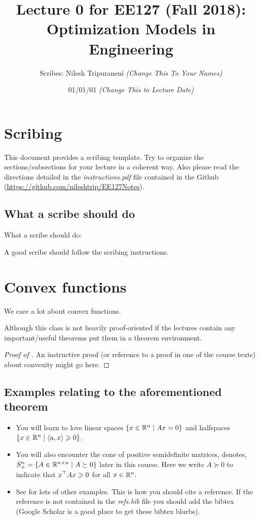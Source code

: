 \documentclass[12pt]{article}
\title{Lecture 0 for EE127 (Fall 2018): Optimization Models in Engineering}
\author{Scribes: Nilesh Tripuraneni \textit{(Change This To Your Names)}}
\date{01/01/01 \textit{(Change This to Lecture Date)}}
\begin{document}
\maketitle

\section{Scribing}

This document provides a scribing template. Try to organize the sections/subsections for your lecture in a coherent way. Also please read the directions detailed in the \emph{instructions.pdf} file contained in the Github (\url{https://github.com/nileshtrip/EE127Notes}).

\subsection{What a scribe should do}
What a scribe should do:
\begin{definition}
A good scribe should follow the scribing instructions.
\end{definition}

\section{Convex functions}
We care a lot about convex functions.

\begin{theorem}
Although this class is not heavily proof-oriented if the lectures contain any important/useful theorems put them in a theorem environment.
\end{theorem}
\begin{proof}[Proof of ]
An instructive proof (or reference to a proof in one of the course texts) about convexity might go here.
\end{proof}

\subsection{Examples relating to the aforementioned theorem}
\begin{itemize}
\item You will learn to love linear spaces $\{x\in\mathbb{R}^n\mid Ax=0\}$ and halfspaces $\{x\in\mathbb{R}^n \mid \langle a, x\rangle \geqslant 0 \}$.
\item You will also encounter the cone of positive semidefinite matrices, denotes, $S^n_+ = \{ A\in\mathbb{R}^{n\times n}\mid A\succeq 0\}$ later in this course. Here we write $A\succeq 0$ to indicate that $x^\top A x\geqslant 0$ for all $x\in\mathbb{R}^n.$
\item See \cite[Ch.2]{boyd2004convex} for lots of other examples. This is how you should cite a reference. If the reference is not contained in the \emph{refs.bib} file you should add the bibtex (Google Scholar is a good place to get these bibtex blurbs).
\end{itemize}
\end{document}
